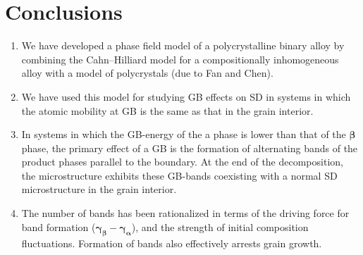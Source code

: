 \chapter{Conclusions}

\begin{enumerate}
\item We have developed a phase field model of a polycrystalline binary alloy by combining the Cahn–Hilliard model for a compositionally inhomogeneous alloy with a model of polycrystals (due to Fan and Chen).
\item We have used this model for studying GB effects on SD in systems in which the atomic mobility at GB is the same as that in the grain interior.
\item In systems in which the GB-energy of the a phase is lower than that of the $\mathbold{\beta}$ phase, the primary effect of a GB is the formation of alternating bands of the product phases parallel to the boundary. At the end of the decomposition, the microstructure exhibits these GB-bands coexisting with a normal SD microstructure in the grain interior.
\item The number of bands has been rationalized in terms of the driving force for band formation ($\mathbold{\gamma_\beta-\gamma_\alpha}$), and the strength of initial composition fluctuations. Formation of bands also effectively arrests grain growth.
\end{enumerate}